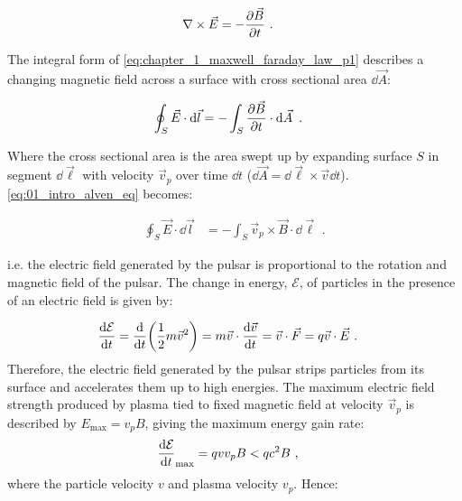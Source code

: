  \begin{equation}
    \begin{aligned}
    \nabla \times \vec{E} &= -\pdv{\vec{B}}{t}\text{ .}
    \end{aligned} \label{eq:chapter_1_maxwell_faraday_law_p1}
\end{equation}

\noindent The integral form of \autoref{eq:chapter_1_maxwell_faraday_law_p1} describes a changing magnetic field across a surface with cross sectional area  $\dd{\vec{A}}$:

\begin{equation}
    \begin{aligned}
    \oint_S \vec{E}\cdot \dd{\vec{l}}&=-\int_S \pdv{\vec{B}}{t} \cdot \dd{\vec{A}}\text{ .}
    \end{aligned} \label{eq:01_intro_alven_eq}
\end{equation}

\noindent Where the cross sectional area is the area swept up by expanding surface $S$ in segment $\dd{\vec{\ell}}$ with velocity $\vec{v}_p$ over time $\dd{t}$ ($\dd{\vec{A}}=\dd{\vec{\ell}}\times \vec{v}\dd{t}$). \autoref{eq:01_intro_alven_eq} becomes: 

\begin{equation}
    \begin{aligned}
    \oint_S \vec{E}\cdot \dd{\vec{l}}&=-\int_S \vec{v}_p\times \vec{B}\cdot \dd{\vec{\ell}}\text{ .}
    \end{aligned} \label{eq:chapter_1_maxwell_faraday_law_p2}
\end{equation}

\noindent i.e. the electric field generated by the pulsar is proportional to the rotation and magnetic field of the pulsar. 
\newpar 
The change in energy, $\mathcal{E}$, of particles in the presence of an electric field is given by:

\begin{equation}
    \begin{aligned}
    \dv{\mathcal{E}}{t}&=\dv{}{t} \qty(\frac{1}{2} m\vec{v}^2) = m \vec{v} \cdot \dv{\vec{v}}{t} = \vec{v} \cdot \vec{F} = q\vec{v} \cdot \vec{E}\text{ .}
    \end{aligned} \label{eq:chapter_1_gain_energy_fields}
\end{equation}
\noindent Therefore, the electric field generated by the pulsar strips particles from its surface and accelerates them up to high energies. The maximum electric field strength produced by plasma tied to fixed magnetic field at velocity $\vec{v}_p$ is described by $E_\text{max}=v_{p}B$, giving the maximum energy gain rate:
\begin{equation}
    \begin{aligned}
    \dv{\mathcal{E}}{t}_\text{max}&=qvv_{p}B<qc^2B\text{ ,}
    \end{aligned}
\end{equation}
\noindent where the particle velocity $v$ and plasma velocity $v_p$. Hence:

